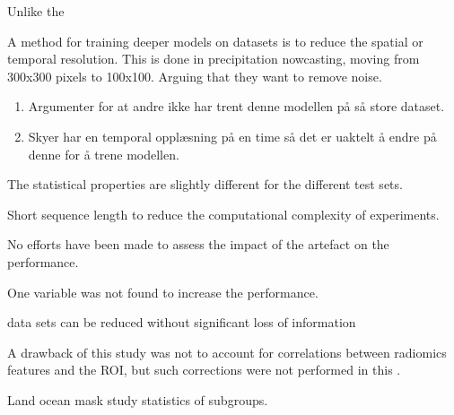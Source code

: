 Unlike the \cite{}

A method for training deeper models on datasets is to reduce the spatial or temporal resolution. This is done in precipitation nowcasting, moving from 300x300 pixels to 100x100. Arguing that they want to remove noise.

\begin{enumerate}
    \item Argumenter for at andre ikke har trent denne modellen på så store dataset. 
    \item Skyer har en temporal opplæsning på en time så det er uaktelt å endre på denne for å trene modellen. 
\end{enumerate}


The statistical properties are slightly different for the different test sets.  

Short sequence length to reduce the computational complexity of experiments. 

No efforts have been made to assess the impact of the artefact on the performance.

One variable was not found to increase the performance.


data sets can be reduced without significant loss of information

A drawback of this study was not to account for correlations between radiomics features and the ROI, but such corrections were
not performed in this .

Land ocean mask study statistics of subgroups.
